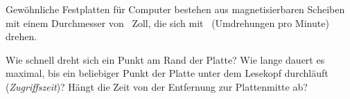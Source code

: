 Gewöhnliche Festplatten für Computer bestehen aus magnetisierbaren Scheiben mit einem Durchmesser von \dZO\ Zoll, die sich mit \fUO\ (Umdrehungen pro Minute) drehen.
\begin{abcliste}
\abc Wie schnell dreht sich ein Punkt am Rand der Platte?
\abc Wie lange dauert es maximal, bis ein beliebiger Punkt der Platte unter dem Lesekopf durchläuft (\emph{Zugriffszeit})? Hängt die Zeit von der Entfernung zur Plattenmitte ab?
\end{abcliste}

